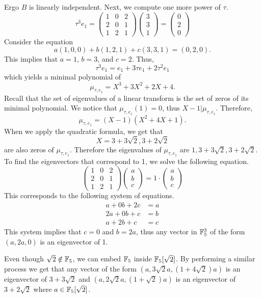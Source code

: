 \documentclass[notitlepage]{problem-solving}
\begin{document}
Ergo $B$ is linearly independent.
Next, we compute one more power of $\tau$.
\[
\tau^3 e_1 =
\begin{pmatrix}
	1 & 0 & 2\\
	2 & 0 & 1\\
	1 & 2 & 1
\end{pmatrix}
\begin{pmatrix}
	3\\
	3\\
	1
\end{pmatrix}
=
\begin{pmatrix}
	0\\
	2\\
	0
\end{pmatrix}
\]
Consider the equation
\[
	a(1,0,0)+b(1,2,1)+c(3,3,1)=(0,2,0).
\]
This implies that $a=1$, $b=3$, and $c=2$.
Thus,
\[
	\tau^3e_1=e_1 + 3\tau e_1 + 2 \tau^2 e_1
\]
which yields a minimal polynomial of
\[
	\mu_{\tau, e_1} = X^3 +3X^2 + 2X +4.
\]
Recall that the set of eigenvalues of a linear transform is the set of zeros of its minimal polynomial.
We notice that $\mu_{\tau,e_1}(1)=0$, thus $X-1|\mu_{\tau,e_1}$.
Therefore,
\[
	\mu_{\tau,e_1} = (X-1)(X^2+4X+1).
\]
When we apply the quadratic formula, we get that
\[
	X= 3 + 3\sqrt{2}, 3+2\sqrt{2}
\]
are also zeros of $\mu_{\tau,e_1}$.
Therefore the eigenvalues of $\mu_{\tau,e_1}$ are $1, 3+3\sqrt{2}, 3+2\sqrt{2}$.
To find the eigenvectors that correspond to 1, we solve the following equation.
\[
\begin{pmatrix}
	1 & 0 & 2\\
	2 & 0 & 1\\
	1 & 2 & 1
\end{pmatrix}
\begin{pmatrix}
	a\\
	b\\
	c
\end{pmatrix}
=
1\cdot
\begin{pmatrix}
	a\\
	b\\
	c
\end{pmatrix}
\]
This corresponds to the following system of equations.
\begin{align*}
	a + 0b + 2c &= a\\
	2a + 0b + c &= b\\
	a + 2b + c &= c
\end{align*}
This system implies that $c = 0$ and $b = 2a$, thus any vector in $\mathbb{F}_5^3$ of the form $(a,2a,0)$ is an eigenvector of 1.

Even though $\sqrt{2}\notin\mathbb{F}_5$, we can embed $\mathbb{F}_5$ inside $\mathbb{F}_5[\sqrt{2}]$.
By performing a similar process we get that any vector of the form $(a,3\sqrt{2} a, (1+4\sqrt{2})a)$ is an eigenvector of $3+3\sqrt{2}$ and $(a,2\sqrt{2} a, (1+\sqrt{2})a)$ is an eigenvector of $3+2\sqrt{2}$ where $a\in\mathbb{F}_{5}[\sqrt{2}]$.
\end{document}
